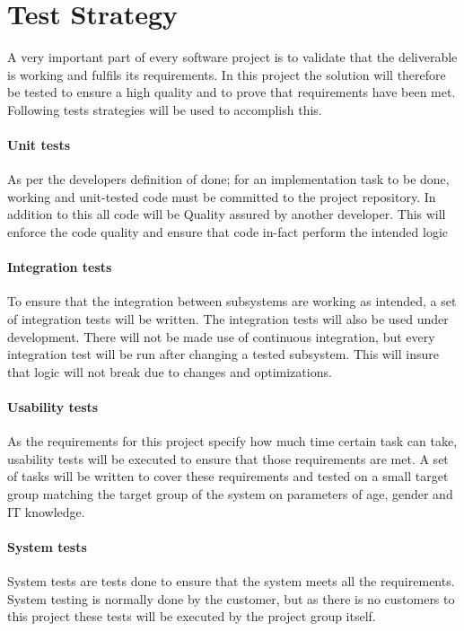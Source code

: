\documentclass[../report.tex]{subfiles}
\begin{document}
\graphicspath{{img/}{../img/}}

\section{Test Strategy}

A very important part of every software project is to validate that the deliverable is working and fulfils its requirements. In this project the solution will therefore be tested to ensure a high quality and to prove that requirements have been met. Following tests strategies will be used to accomplish this.

\paragraph{Unit tests}
As per the developers definition of done; for an implementation task to be done, working and unit-tested code must be committed to the project repository. In addition to this all code will be Quality assured by another developer. This will enforce the code quality and ensure that code in-fact perform the intended logic

\paragraph{Integration tests}

To ensure that the integration between subsystems are working as intended, a set of integration tests will be written. The integration tests will also be used under development. There will not be made use of continuous integration, but every integration test will be run after changing a tested subsystem. This will insure that logic will not break due to changes and optimizations.

\paragraph{Usability tests}
As the requirements for this project specify how much time certain task can take, usability tests will be executed to ensure that those requirements are met. A set of tasks will be written to cover these requirements and tested on a small target group matching the target group of the system on parameters of age, gender and IT knowledge.

\paragraph{System tests}
System tests are tests done to ensure that the system meets all the requirements. System testing is normally done by the customer, but as there is no customers to this project these tests will be executed by the project group itself.
\end{document}
